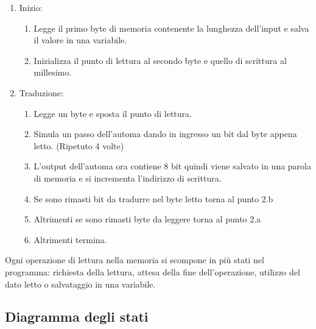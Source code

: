 \documentclass{article}
\begin{document}
\begin{enumerate}
	\item Inizio:
	\begin{enumerate}
		\item Legge il primo byte di memoria contenente la lunghezza dell'input e salva il valore in una variabile.
		\item Inizializza il punto di lettura al secondo byte e quello di scrittura al millesimo.
	\end{enumerate}
	\item Traduzione:
	\begin{enumerate}
		\item Legge un byte e sposta il punto di lettura.
		\item Simula un passo dell'automa dando in ingresso un bit dal byte appena letto. (Ripetuto 4 volte)
		\item L'output dell'automa ora contiene 8 bit quindi viene salvato in una parola di memoria e si incrementa l'indirizzo di scrittura.
		\item Se sono rimasti bit da tradurre nel byte letto torna al punto 2.b
		\item Altrimenti se sono rimasti byte da leggere torna al punto 2.a
		\item Altrimenti termina.
	\end{enumerate}
\end{enumerate}

Ogni operazione di lettura nella memoria si scompone in più stati nel programma: richiesta della lettura, attesa della fine dell'operazione, utilizzo del dato letto o salvataggio in una variabile. 

\subsection{Diagramma degli stati}
\end{document}
